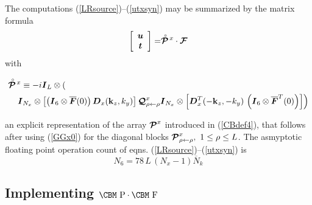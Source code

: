 The computations (\ref{LRsource})--(\ref{utxsyn}) may be summarized by the matrix formula
\[
\left[ \begin{array}{c}{\mbox{\boldmath$\mit u$\unboldmath}}\\ {\mbox{\boldmath$\mit t$\unboldmath}}\end{array} \right]=
\stackrel{\scriptscriptstyle _{\,\,\circ}}{ \mbox{\boldmath$\cal P$\unboldmath}}\!{}^{x}\cdot {\mbox{\boldmath$\cal F$\unboldmath}}
\]
with
\begin{samepage}
\begin{eqnarray}	\label{GGx1}
\lefteqn{\rf{\CB P}\!{}^{x} \equiv -{i}{\bmi I}_L \otimes\left( \right.}\\
&&
\left.
{\bmi I}_{N_x} \otimes
\left[\left({\bmi I}_6\otimes \overline{\bmi F}(0)  \right)
 {\bmi  D}_{x}({\bf k}_{z},{k}_{y})\right]
 {\CB Q}^{x}_{\rho \leftarrow \rho}
{\bmi I}_{N_x} \otimes \left[{\bmi  D}_{x}^{T}(-{\bf k}_{z},-{k}_{y})
\,\left({\bmi I}_6\otimes \overline{\bmi F}^{T}(0)  \right)
\right] \right)\nonumber
\end{eqnarray}
\end{samepage}
an explicit representation of the array ${\mbox{\boldmath$\cal P$\unboldmath}}^{x}$ introduced in (\ref{CBdef4}),
that follows after using (\ref{GGx0}) for the diagonal blocks ${\mbox{\boldmath$\cal P$\unboldmath}}^{x}_{\rho \leftarrow 
\rho}, \ 1 \le \rho \le L$.
The asmyptotic floating point operation count of eqns. (\ref{LRsource})--(\ref{utxsyn})
is
\begin{equation} \label{N6def}
N_6=78\,L\,(N_x-1)  \overline{N}_k
\end{equation} 



\subsection{ Implementing $\mbox{\CBM  P}\cdot\mbox{\CBM  F}$}


